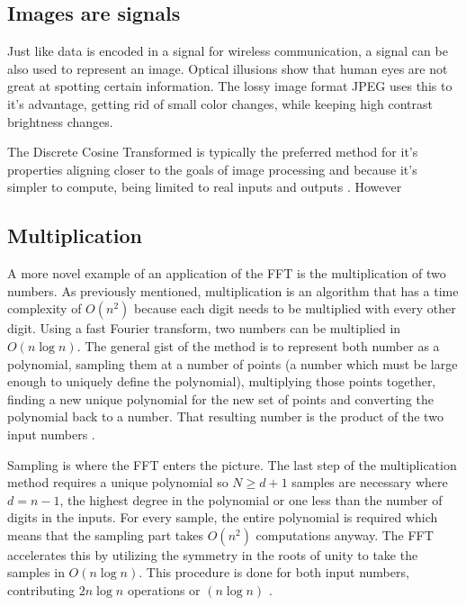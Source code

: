 
\subsection{Images are signals}
Just like data is encoded in a signal for wireless communication, a signal can be also used to represent an image. Optical illusions show that human  eyes are not great at spotting certain information. The lossy image format JPEG uses this to it's advantage, getting rid of small color changes, while keeping high contrast brightness changes.  

The Discrete Cosine Transformed  is typically the preferred method for it's properties aligning closer to the goals of image processing and because it's simpler to compute, being limited to real inputs and outputs . However 

\subsection{Multiplication}
A more novel example of an application of the FFT is the multiplication of two numbers. As previously mentioned, multiplication is an algorithm that has a time complexity of $O(n^2)$ because each digit needs to be multiplied with every other digit. Using a fast Fourier transform, two numbers can be multiplied in $O(n \log n)$. The general gist of the method is to represent both number as a polynomial, sampling them at a number of points (a number which must be large enough to uniquely define the polynomial), multiplying those points together, finding a new unique polynomial for the new set of points and converting the polynomial back to a number. That resulting number is the product of the two input numbers \cite{Reducible2020}.

Sampling is where the FFT enters the picture. The last step of the multiplication method requires a unique polynomial so $N \geq d+1$ samples are necessary where $d = n-1$, the highest degree in the polynomial or one less than the number of digits in the inputs. For every sample, the entire polynomial is required which means that the sampling part takes $O(n^2)$ computations anyway. The FFT accelerates this by utilizing the symmetry in the roots of unity to take the samples in $O(n \log n)$. This procedure is done for both input numbers, contributing $2n \log n$ operations or $(n \log n)$ \cite{Reducible2020}.

